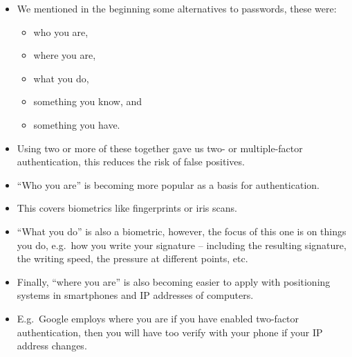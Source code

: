 \documentclass{beamer}
\begin{document}
\begin{frame}{\insertsubsectionhead}
  \begin{itemize}
    \item We mentioned in the beginning some alternatives to passwords, these 
      were:
      \begin{itemize}
        \item who you are,
        \item where you are,
        \item what you do,
        \item something you know, and
        \item something you have.
      \end{itemize}

    \item Using two or more of these together gave us two- or multiple-factor 
      authentication, this reduces the risk of false positives.

  \end{itemize}
\end{frame}

\begin{frame}{\insertsubsectionhead}
  \begin{itemize}
    \item ``Who you are'' is becoming more popular as a basis for 
      authentication.

    \item This covers biometrics like fingerprints or iris scans.

    \item ``What you do'' is also a biometric, however, the focus of this one 
      is on things you do, e.g.\ how you write your signature -- including the 
      resulting signature, the writing speed, the pressure at different points, 
      etc.

    \item Finally, ``where you are'' is also becoming easier to apply with 
      positioning systems in smartphones and IP addresses of computers.

    \item E.g.\ Google employs where you are if you have enabled two-factor 
      authentication, then you will have too verify with your phone if your IP 
      address changes.
  \end{itemize}
\end{frame}
\end{document}
